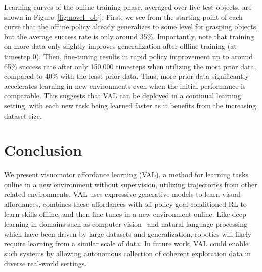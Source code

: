 Learning curves of the online training phase, averaged over five test objects, are shown in Figure~\ref{fig:novel_obj}. 
First, we see from the starting point of each curve that the offline policy already generalizes to some level for grasping objects, but the average success rate is only around 35\%. 
Importantly, note that training on more data only slightly improves generalization after offline training (at timestep 0).
Then, fine-tuning results in rapid policy improvement up to around 65\% success rate after only 150,000 timesteps when utilizing the most prior data, compared to 40\% with the least prior data.
Thus, more prior data significantly accelerates learning in new environments even when the initial performance is comparable.
This suggests that VAL can be deployed in a continual learning setting, with each new task being learned faster as it benefits from the increasing dataset size.



\section{Conclusion}
\label{sec:conclusion}

We present visuomotor affordance learning (VAL), a method for learning tasks online in a new environment without supervision, utilizing trajectories from other related environments. VAL uses expressive generative models to learn visual affordances, combines these affordances with off-policy goal-conditioned RL to learn skills offline, and then fine-tunes in a new environment online. Like deep learning in domains such as computer vision~\citep{krizhevsky2012imagenet} and natural language processing~\citep{devlin2019bert} which have been driven by large datasets and generalization, robotics will likely require learning from a similar scale of data. In future work, VAL could enable such systems by allowing autonomous collection of coherent exploration data in diverse real-world settings.

